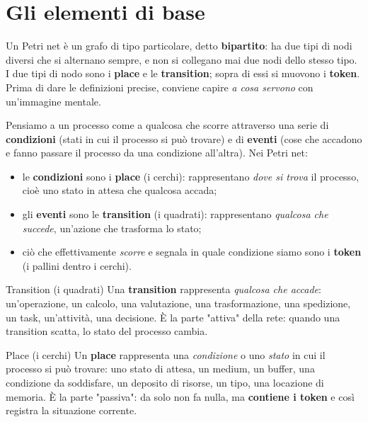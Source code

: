 \section{\texorpdfstring{Gli elementi di base}{Gli elementi di base}}

Un Petri net è un grafo di tipo particolare, detto \textbf{bipartito}: ha due tipi di nodi diversi che si alternano sempre, e non si collegano mai due nodi dello stesso tipo. I due tipi di nodo sono i \textbf{place} e le \textbf{transition}; sopra di essi si muovono i \textbf{token}. Prima di dare le definizioni precise, conviene capire \emph{a cosa servono} con un'immagine mentale.

Pensiamo a un processo come a qualcosa che scorre attraverso una serie di \textbf{condizioni} (stati in cui il processo si può trovare) e di \textbf{eventi} (cose che accadono e fanno passare il processo da una condizione all'altra). Nei Petri net:

\begin{itemize}
\item le \textbf{condizioni} sono i \textbf{place} (i cerchi): rappresentano \emph{dove si trova} il processo, cioè uno stato in attesa che qualcosa accada;
\item gli \textbf{eventi} sono le \textbf{transition} (i quadrati): rappresentano \emph{qualcosa che succede}, un'azione che trasforma lo stato;
\item ciò che effettivamente \emph{scorre} e segnala in quale condizione siamo sono i \textbf{token} (i pallini dentro i cerchi).
\end{itemize}

\begin{boxdefinition}{Transition (i quadrati)}
Una \textbf{transition} rappresenta \emph{qualcosa che accade}: un'operazione, un calcolo, una valutazione, una trasformazione, una spedizione, un task, un'attività, una decisione. È la parte "attiva" della rete: quando una transition scatta, lo stato del processo cambia.
\end{boxdefinition}

\begin{boxdefinition}{Place (i cerchi)}
Un \textbf{place} rappresenta una \emph{condizione} o uno \emph{stato} in cui il processo si può trovare: uno stato di attesa, un medium, un buffer, una condizione da soddisfare, un deposito di risorse, un tipo, una locazione di memoria. È la parte "passiva": da solo non fa nulla, ma \textbf{contiene i token} e così registra la situazione corrente.
\end{boxdefinition}

